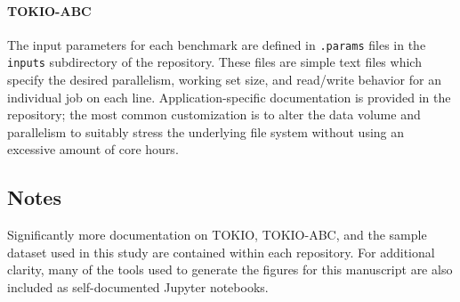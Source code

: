 \paragraph{TOKIO-ABC} The input parameters for each benchmark are defined in \texttt{.params} files in the \texttt{inputs} subdirectory of the repository.
These files are simple text files which specify the desired parallelism, working set size, and read/write behavior for an individual job on each line.
Application-specific documentation is provided in the repository; the most common customization is to alter the data volume and parallelism to suitably stress the underlying file system without using an excessive amount of core hours.

\subsection{Notes}

Significantly more documentation on TOKIO, TOKIO-ABC, and the sample dataset used in this study are contained within each repository.
For additional clarity, many of the tools used to generate the figures for this manuscript are also included as self-documented Jupyter notebooks.
